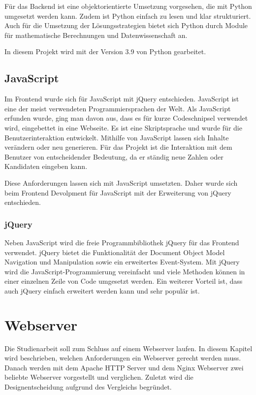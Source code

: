 Für das Backend ist eine objektorientierte Umsetzung vorgesehen, die mit Python umgesetzt werden kann. Zudem ist Python einfach zu lesen und klar strukturiert. Auch für die Umsetzung der Lösungsstrategien bietet sich Python durch Module für mathematische Berechnungen und Datenwissenschaft an. 

In diesem Projekt wird mit der Version 3.9 von Python gearbeitet. \cite{Python} \cite[50\psqq]{DataToolkit} \cite{stackoverflow}

\subsection{JavaScript}
Im Frontend wurde sich für JavaScript mit jQuery entschieden. JavaScript ist eine der meist verwendeten Programmiersprachen der Welt. Als JavaScript erfunden wurde, ging man davon aus, dass es für kurze Codeschnipsel verwendet wird, eingebettet in eine Webseite. Es ist eine Skriptsprache und wurde für die Benutzerinteraktion entwickelt. Mithilfe von JavaScript lassen sich Inhalte verändern oder neu generieren. Für das Projekt ist die Interaktion mit dem Benutzer von entscheidender Bedeutung, da er ständig neue Zahlen oder Kandidaten eingeben kann. 

Diese Anforderungen lassen sich mit JavaScript umsetzten. Daher wurde sich beim Frontend Devolpment für JavaScript mit der Erweiterung von jQuery entschieden. \cite[7\psqq]{Java} \cite{stackoverflow}


\subsubsection{jQuery}
Neben JavaScript wird die freie Programmbibliothek jQuery für das Frontend verwendet. jQuery bietet die Funktionalität der Document Object Model Navigation und Manipulation sowie ein erweitertes Event-System. Mit jQuery wird die JavaScript-Programmierung vereinfacht und viele Methoden können in einer einzelnen Zeile von Code umgesetzt werden. Ein weiterer Vorteil ist, dass auch jQuery einfach erweitert werden kann und sehr populär ist. \cite{w3schoolsjQuery}


\section{Webserver}
Die Studienarbeit soll zum Schluss auf einem Webserver laufen. In diesem Kapitel wird beschrieben, welchen Anforderungen ein Webserver gerecht werden muss. Danach werden mit dem Apache HTTP Server und dem Nginx Webserver zwei beliebte Webserver vorgestellt und verglichen. Zuletzt wird die Designentscheidung aufgrund des Vergleichs begründet.

